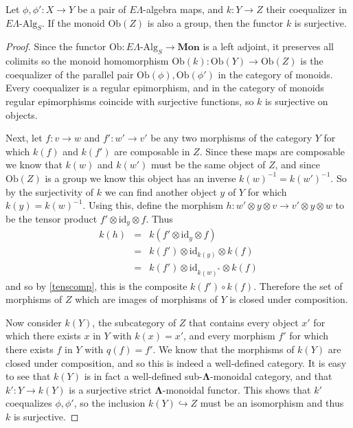\documentclass{amsbook} %
\newcommand{\mb}{\mathbf}
\newcommand{\ML}{\mathbf{\Lambda}}
\newcommand{\bigquotient}[2]{ \raisebox{0.75\height}{$#1$} \mkern-12mu\scalebox{2}{$\diagup$}\mkern-10mu \raisebox{-0.5\height}{$#2$} }
\newcommand{\mon}{\ensuremath{\mb{Mon}}}
\numberwithin{section}{chapter}
\begin{document}
\begin{prop}\label{coeqsurj} Let $\phi, \phi' : X \to Y$ be a pair of $E\Lambda$-algebra maps, and $k: Y \to Z$ their coequalizer in $E\Lambda\mbox{-}\mathrm{Alg}_S$. If the monoid $\mathrm{Ob}(Z)$ is also a group, then the functor $k$ is surjective.
\end{prop}
\begin{proof}
Since the functor $\mathrm{Ob} : E\Lambda\mbox{-}\mathrm{Alg}_S \to \mon$ is a left adjoint, it preserves all colimits so the monoid homomorphism $\mathrm{Ob}(k): \mathrm{Ob}(Y) \to \mathrm{Ob}(Z)$ is the coequalizer of the parallel pair $\mathrm{Ob}(\phi), \mathrm{Ob}(\phi')$ in the category of monoids. Every coequalizer is a regular epimorphism, and in the category of monoids regular epimorphisms coincide with  surjective functions, so $k$ is surjective on objects.



Next, let $f: v \to w$ and $f' : w' \to v'$ be any two morphisms of the category $Y$ for which $k(f)$ and $k(f')$ are composable in $Z$. Since these maps are composable we know that $k(w)$ and $k(w')$ must be the same object of $Z$, and since $\mathrm{Ob}(Z)$ is a group we know this object has an inverse $k(w)^{-1} = k(w')^{-1}$. So by the surjectivity of $k$ we can find another object $y$ of $Y$ for which $k(y) = k(w)^{-1}$. Using this, define the morphism $h: w' \otimes y \otimes v \to v' \otimes y \otimes w$ to be the tensor product $f' \otimes \mathrm{id}_y \otimes f$. Thus
\[ \begin{array}{rll}
		k(h) & = & k(f' \otimes \mathrm{id}_y \otimes f) \\
		& = & k(f') \otimes \mathrm{id}_{k(y)} \otimes k(f) \\
		& = & k(f') \otimes \mathrm{id}_{k(w)^*} \otimes k(f)
		\end{array}
\]
and so by \cref{tenscomp}, this is the composite $k(f') \circ k(f)$. Therefore the set of morphisms of $Z$ which are images of morphisms of $Y$ is closed under composition. 

Now consider $k(Y)$, the subcategory of $Z$ that contains every object $x'$ for which there exists $x$ in $Y$ with $k(x) = x'$, and every morphism $f'$ for which there exists $f$ in $Y$ with $q(f) = f'$. We know that the morphisms of $k(Y)$ are closed under composition, and so this is indeed a well-defined category. It is easy to see that $k(Y)$ is in fact a well-defined sub-$\ML$-monoidal category, and that $k': Y \to k(Y)$ is a surjective strict $\ML$-monoidal functor. This shows that $k'$ coequalizes $\phi, \phi'$, so the inclusion $k(Y) \hookrightarrow Z$ must be an isomorphism and thus $k$ is surjective.


\end{proof}
\end{document}
